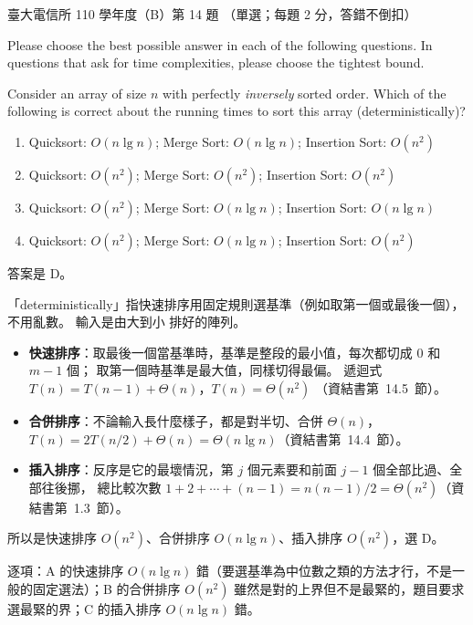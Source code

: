 \begin{pastexam}[label={px:ntu-110-comm-dsa-14}]{臺大電信所 110 學年度（B）第 14 題}
（單選；每題 2 分，答錯不倒扣）

Please choose the best possible answer in each of the following questions. In questions that ask for time complexities, please choose the tightest bound.

Consider an array of size $n$ with perfectly \textit{inversely} sorted order. Which of the following is correct about the running times to sort this array (deterministically)?
\begin{enumerate}[label=\Alph*.]
\item Quicksort: $O(n\lg n)$; Merge Sort: $O(n\lg n)$; Insertion Sort: $O(n^2)$
\item Quicksort: $O(n^2)$; Merge Sort: $O(n^2)$; Insertion Sort: $O(n^2)$
\item Quicksort: $O(n^2)$; Merge Sort: $O(n\lg n)$; Insertion Sort: $O(n\lg n)$
\item Quicksort: $O(n^2)$; Merge Sort: $O(n\lg n)$; Insertion Sort: $O(n^2)$
\end{enumerate}
\end{pastexam}

\begin{pastsoln}
答案是 D。

「deterministically」指快速排序用固定規則選基準（例如取第一個或最後一個），不用亂數。 輸入是由大到小
排好的陣列。
\begin{itemize}
\item \textbf{快速排序}：取最後一個當基準時，基準是整段的最小值，每次都切成 $0$ 和 $m - 1$ 個；
取第一個時基準是最大值，同樣切得最偏。 遞迴式 $T(n) = T(n - 1) + \Theta(n)$，$T(n) = \Theta(n^2)$
（資結書第~14.5~節）。
\item \textbf{合併排序}：不論輸入長什麼樣子，都是對半切、合併 $\Theta(n)$，$T(n) = 2T(n/2) + \Theta(n)
= \Theta(n\lg n)$（資結書第~14.4~節）。
\item \textbf{插入排序}：反序是它的最壞情況，第 $j$ 個元素要和前面 $j - 1$ 個全部比過、全部往後挪，
總比較次數 $1 + 2 + \cdots + (n - 1) = n(n - 1)/2 = \Theta(n^2)$（資結書第~1.3~節）。
\end{itemize}
所以是快速排序 $O(n^2)$、合併排序 $O(n\lg n)$、插入排序 $O(n^2)$，選 D。

逐項：A 的快速排序 $O(n\lg n)$ 錯（要選基準為中位數之類的方法才行，不是一般的固定選法）；B 的合併排序
$O(n^2)$ 雖然是對的上界但不是最緊的，題目要求選最緊的界；C 的插入排序 $O(n\lg n)$ 錯。
\end{pastsoln}

